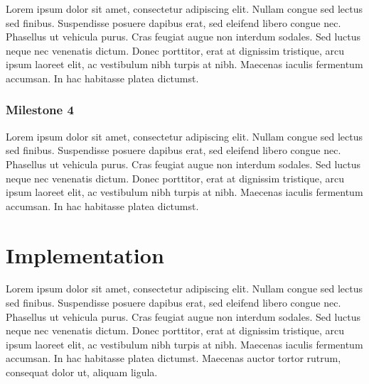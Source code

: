 \documentclass{utitcphd_overleaf}
\begin{document}
Lorem ipsum dolor sit amet, consectetur adipiscing elit. Nullam congue sed lectus sed finibus. Suspendisse posuere dapibus erat, sed eleifend libero congue nec. Phasellus ut vehicula purus. Cras feugiat augue non interdum sodales. Sed luctus neque nec venenatis dictum. Donec porttitor, erat at dignissim tristique, arcu ipsum laoreet elit, ac vestibulum nibh turpis at nibh. Maecenas iaculis fermentum accumsan. In hac habitasse platea dictumst.

\subsection{Milestone 4}

Lorem ipsum dolor sit amet, consectetur adipiscing elit. Nullam congue sed lectus sed finibus. Suspendisse posuere dapibus erat, sed eleifend libero congue nec. Phasellus ut vehicula purus. Cras feugiat augue non interdum sodales. Sed luctus neque nec venenatis dictum. Donec porttitor, erat at dignissim tristique, arcu ipsum laoreet elit, ac vestibulum nibh turpis at nibh. Maecenas iaculis fermentum accumsan. In hac habitasse platea dictumst.

\chapter{Implementation}
\label{chap:implementation}

Lorem ipsum dolor sit amet, consectetur adipiscing elit. Nullam congue sed lectus sed finibus. Suspendisse posuere dapibus erat, sed eleifend libero congue nec. Phasellus ut vehicula purus. Cras feugiat augue non interdum sodales. Sed luctus neque nec venenatis dictum. Donec porttitor, erat at dignissim tristique, arcu ipsum laoreet elit, ac vestibulum nibh turpis at nibh. Maecenas iaculis fermentum accumsan. In hac habitasse platea dictumst. Maecenas auctor tortor rutrum, consequat dolor ut, aliquam ligula.




\end{document}
